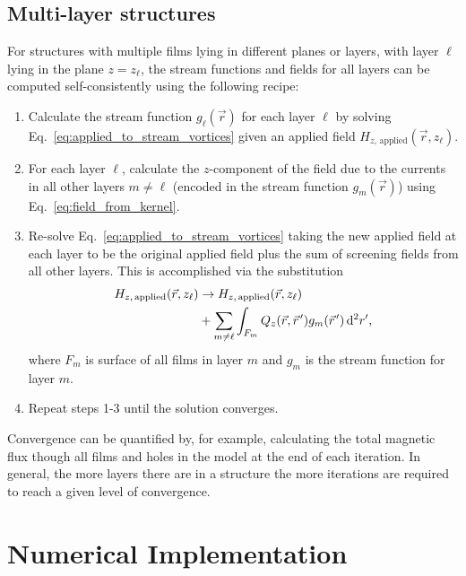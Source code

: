 \documentclass[final,3p,times,twocolumn]{elsarticle}
\newcommand{\pvec}[1]{\vec{#1}\mkern2mu\vphantom{#1}}
\begin{document}
\subsection{Multi-layer structures}
\label{section:model:multilayer}

For structures with multiple films lying in different planes or layers, with layer $\ell$ lying in the plane $z=z_\ell$,
the stream functions and fields for all layers can be computed self-consistently using the following recipe:

\begin{enumerate}
    \item{
        Calculate the stream function $g_\ell(\vec{r})$ for each layer $\ell$ by solving Eq.~\ref{eq:applied_to_stream_vortices} given an applied field $H_{z,\,\mathrm{applied}}(\vec{r}, z_\ell)$.
    }
    \item{
        For each layer $\ell$, calculate the $z$-component of the field due to the currents in all other layers $m\neq\ell$ (encoded in the stream function $g_m(\vec{r})$)
        using Eq.~\ref{eq:field_from_kernel}.
    }
    \item{
        Re-solve Eq.~\ref{eq:applied_to_stream_vortices} taking the new applied field at each layer to be the original applied field plus the sum of screening fields from all other layers. This is accomplished via the substitution
        \begin{align}
        \begin{split}
            H_{z,\,\mathrm{applied}}(\vec{r}, z_\ell)
            &\to H_{z,\,\mathrm{applied}}(\vec{r}, z_\ell)\\
            &+ \sum_{m\neq\ell}
            \int_{F_m} Q_z(\vec{r},\pvec{r}')g_m(\pvec{r}')\,\mathrm{d}^2r',
            \label{eq:iterative}
        \end{split}
        \end{align}
        where $F_m$ is surface of all films in layer $m$ and $g_m$ is the stream function for layer $m$.
    }
    \item{
        Repeat steps 1-3 until the solution converges.
    }
\end{enumerate}

Convergence can be quantified by, for example, calculating the total magnetic flux though all films and holes in the model at the end of each iteration. In general, the more layers there are in a structure the more iterations are  required to reach a given level of convergence.

\section{Numerical Implementation}
\label{section:implementation}
\end{document}
